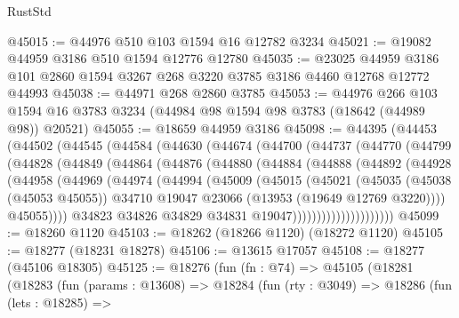 \begin{lexlean}{RustStd}
\begin{coremodule}
@45015 := @44976 @510 @103 @1594 @16 @12782 @3234
@45021 := @19082 @44959 @3186 @510 @1594 @12776 @12780
@45035 := @23025
    @44959
    @3186
    @101
    @2860
    @1594
    @3267
    @268
    @3220
    @3785
    @3186
    @4460
    @12768
    @12772
    @44993
@45038 := @44971 @268 @2860 @3785
@45053 := @44976
    @266
    @103
    @1594
    @16
    @3783
    @3234
    (@44984 @98 @1594 @98 @3783 (@18642 (@44989 @98)) @20521)
@45055 := @18659 @44959 @3186
@45098 := @44395
    (@44453
      (@44502
        (@44545
          (@44584
            (@44630
              (@44674
                (@44700
                  (@44737
                    (@44770
                      (@44799
                        (@44828
                          (@44849
                            (@44864
                              (@44876
                                (@44880
                                  (@44884
                                    (@44888
                                      (@44892
                                        (@44928
                                          (@44958
                                            (@44969
                                              (@44974
                                                (@44994
                                                  (@45009
                                                    (@45015
                                                      (@45021
                                                        (@45035
                                                          (@45038 (@45053 @45055))
                                                          @34710
                                                          @19047
                                                          @23066
                                                          (@13953 (@19649 @12769 @3220))))
                                                      @45055))))
                                              @34823
                                              @34826
                                              @34829
                                              @34831
                                              @19047)))))))))))))))))))))
@45099 := @18260 @1120
@45103 := @18262 (@18266 @1120) (@18272 @1120)
@45105 := @18277 (@18231 @18278)
@45106 := @13615 @17057
@45108 := @18277 (@45106 @18305)
@45125 := @18276
    (fun (fn : @74) =>
    @45105
      (@18281
        (@18283
          (fun (params : @13608) =>
          @18284
            (fun (rty : @3049) =>
            @18286
              (fun (lets : @18285) =>

\end{coremodule}
\end{lexlean}
